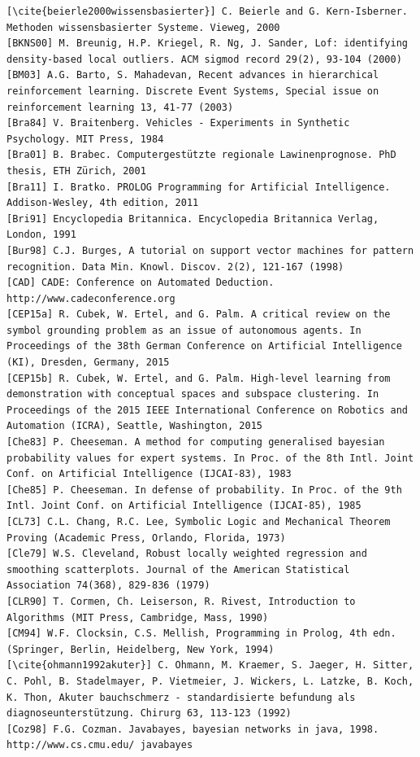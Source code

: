 \documentclass[10pt]{article}
\begin{document}
\begin{verbatim}
[\cite{beierle2000wissensbasierter}] C. Beierle and G. Kern-Isberner. Methoden wissensbasierter Systeme. Vieweg, 2000
[BKNS00] M. Breunig, H.P. Kriegel, R. Ng, J. Sander, Lof: identifying density-based local outliers. ACM sigmod record 29(2), 93-104 (2000)
[BM03] A.G. Barto, S. Mahadevan, Recent advances in hierarchical reinforcement learning. Discrete Event Systems, Special issue on reinforcement learning 13, 41-77 (2003)
[Bra84] V. Braitenberg. Vehicles - Experiments in Synthetic Psychology. MIT Press, 1984
[Bra01] B. Brabec. Computergestützte regionale Lawinenprognose. PhD thesis, ETH Zürich, 2001
[Bra11] I. Bratko. PROLOG Programming for Artificial Intelligence. Addison-Wesley, 4th edition, 2011
[Bri91] Encyclopedia Britannica. Encyclopedia Britannica Verlag, London, 1991
[Bur98] C.J. Burges, A tutorial on support vector machines for pattern recognition. Data Min. Knowl. Discov. 2(2), 121-167 (1998)
[CAD] CADE: Conference on Automated Deduction. http://www.cadeconference.org
[CEP15a] R. Cubek, W. Ertel, and G. Palm. A critical review on the symbol grounding problem as an issue of autonomous agents. In Proceedings of the 38th German Conference on Artificial Intelligence (KI), Dresden, Germany, 2015
[CEP15b] R. Cubek, W. Ertel, and G. Palm. High-level learning from demonstration with conceptual spaces and subspace clustering. In Proceedings of the 2015 IEEE International Conference on Robotics and Automation (ICRA), Seattle, Washington, 2015
[Che83] P. Cheeseman. A method for computing generalised bayesian probability values for expert systems. In Proc. of the 8th Intl. Joint Conf. on Artificial Intelligence (IJCAI-83), 1983
[Che85] P. Cheeseman. In defense of probability. In Proc. of the 9th Intl. Joint Conf. on Artificial Intelligence (IJCAI-85), 1985
[CL73] C.L. Chang, R.C. Lee, Symbolic Logic and Mechanical Theorem Proving (Academic Press, Orlando, Florida, 1973)
[Cle79] W.S. Cleveland, Robust locally weighted regression and smoothing scatterplots. Journal of the American Statistical Association 74(368), 829-836 (1979)
[CLR90] T. Cormen, Ch. Leiserson, R. Rivest, Introduction to Algorithms (MIT Press, Cambridge, Mass, 1990)
[CM94] W.F. Clocksin, C.S. Mellish, Programming in Prolog, 4th edn. (Springer, Berlin, Heidelberg, New York, 1994)
[\cite{ohmann1992akuter}] C. Ohmann, M. Kraemer, S. Jaeger, H. Sitter, C. Pohl, B. Stadelmayer, P. Vietmeier, J. Wickers, L. Latzke, B. Koch, K. Thon, Akuter bauchschmerz - standardisierte befundung als diagnoseunterstützung. Chirurg 63, 113-123 (1992)
[Coz98] F.G. Cozman. Javabayes, bayesian networks in java, 1998. http://www.cs.cmu.edu/ javabayes

\end{verbatim}
\end{document}
